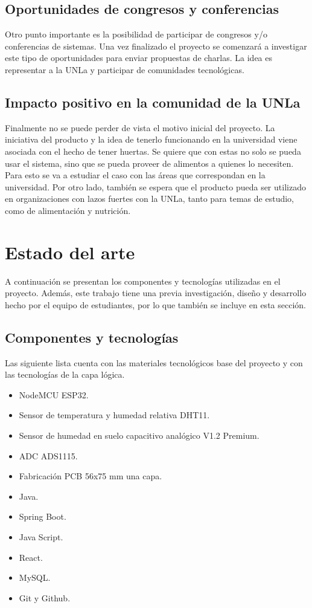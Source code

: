 \subsection{Oportunidades de congresos y conferencias}
Otro punto importante es la posibilidad de participar de congresos y/o conferencias de sistemas. Una vez finalizado el proyecto se comenzará a investigar este tipo de oportunidades para enviar propuestas de charlas. La idea es representar a la UNLa y participar de comunidades tecnológicas.

\subsection{Impacto positivo en la comunidad de la UNLa}
Finalmente no se puede perder de vista el motivo inicial del proyecto. La iniciativa del producto y la idea de tenerlo funcionando en la universidad viene asociada con el hecho de tener huertas. Se quiere que con estas no solo se pueda usar el sistema, sino que se pueda proveer de alimentos a quienes lo necesiten. Para esto se va a estudiar el caso con las áreas que correspondan en la universidad. Por otro lado, también se espera que el producto pueda ser utilizado en organizaciones con lazos fuertes con la UNLa, tanto para temas de estudio, como de alimentación y nutrición.


\section{Estado del arte}
A continuación se presentan los componentes y tecnologías utilizadas en el proyecto. Además, este trabajo tiene una previa investigación, diseño y desarrollo hecho por el equipo de estudiantes, por lo que también se incluye en esta sección.

\subsection{Componentes y tecnologías}
Las siguiente lista cuenta con las materiales tecnológicos base del proyecto y con las tecnologías de la capa lógica.\\

\begin{itemize}
\item NodeMCU ESP32.
\item Sensor de temperatura y humedad relativa DHT11.
\item Sensor de humedad en suelo capacitivo analógico V1.2 Premium.
\item ADC ADS1115.
\item Fabricación PCB 56x75 mm una capa.
\item Java.
\item Spring Boot.
\item Java Script.
\item React.
\item MySQL.
\item Git y Github.\\
\end{itemize}

